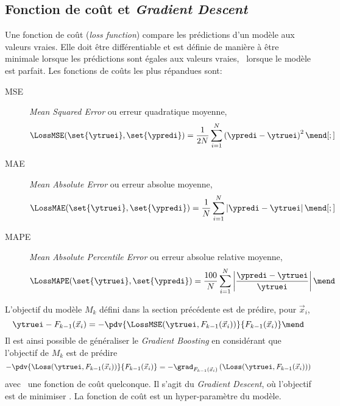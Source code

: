\subsection{Fonction de coût et \emph{Gradient Descent}}\label{chapter-ML-section-loss}
Une fonction de coût (\emph{loss function}) compare les prédictions d'un modèle aux valeurs vraies.
Elle doit être différentiable et est définie de manière à être minimale lorsque les prédictions sont égales aux valeurs vraies, \ie\ lorsque le modèle est parfait.
Les fonctions de coûts les plus répandues sont:
\begin{description}
\item[MSE] \emph{Mean Squared Error} ou erreur quadratique moyenne,
\begin{equation}
\LossMSE(\set{\ytruei}, \set{\ypredi}) = \frac{1}{2N} \sum_{i=1}^N \left( \ypredi - \ytruei \right)^2
\label{eq-loss_MSE}
\mend[;]
\end{equation}
\item[MAE] \emph{Mean Absolute Error} ou erreur absolue moyenne,
\begin{equation}
\LossMAE(\set{\ytruei}, \set{\ypredi}) = \frac{1}{N} \sum_{i=1}^N \left| \ypredi - \ytruei \right|
\label{eq-loss_MAE}
\mend[;]
\end{equation}
\item[MAPE] \emph{Mean Absolute Percentile Error} ou erreur absolue relative moyenne,
\begin{equation}
\LossMAPE(\set{\ytruei}, \set{\ypredi}) = \frac{100}{N} \sum_{i=1}^N \left| \frac{\ypredi - \ytruei}{\ytruei} \right|
\label{eq-loss_MAPE}
\mend
\end{equation}
\end{description}
\par
L'objectif du modèle $M_k$ défini dans la section précédente est de prédire, pour $\vec{x}_i$,
\begin{equation}
\ytruei - F_{k-1}(\vec{x}_i)
=
- \pdv{\LossMSE(\ytruei, F_{k-1}(\vec{x}_i))}{F_{k-1}(\vec{x}_i)}
\mend
\end{equation}
Il est ainsi possible de généraliser le \emph{Gradient Boosting}
en considérant que l'objectif de $M_k$ est de prédire
\begin{equation}
- \pdv{\Loss(\ytruei, F_{k-1}(\vec{x}_i))}{F_{k-1}(\vec{x}_i)}
=
- \grad_{F_{k-1}(\vec{x}_i)} \left(\Loss(\ytruei, F_{k-1}(\vec{x}_i))\right)
\end{equation}
avec \Loss\ une fonction de coût quelconque.
Il s'agit du \emph{Gradient Descent},
où l'objectif est de minimiser \Loss.
La fonction de coût est un hyper-paramètre du modèle.
